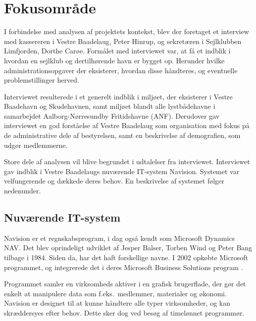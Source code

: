 \section{Fokusområde} %

I forbindelse med analysen af projektets kontekst, blev der foretaget et interview med kassereren i Vestre Baadelaug, Peter Hinrup, og sekretæren i Sejlklubben Limfjorden, Dorthe Carøe. Formålet med interviewet var, at få et indblik i hvordan en sejlklub og dertilhørende havn er bygget op. Herunder hvilke administrationsopgaver der eksisterer, hvordan disse håndteres, og eventuelle problemstillinger herved. 

Interviewet resulterede i et generelt indblik i miljøet, der eksisterer i Vestre Baadehavn og Skudehavnen, samt miljøet blandt alle lystbådehavne i samarbejdet Aalborg-Nørresundby Fritidshavne (ANF). Derudover gav interviewet en god forståelse af Vestre Baadelaug som organisation med fokus på de administrative dele af bestyrelsen, samt en beskrivelse af demografien, som udgør medlemmerne.

Store dele af analysen vil blive begrundet i udtalelser fra interviewet. Interviewet gav indblik i Vestre Baadelaugs nuværende IT-system Navision. Systemet var velfungerende og dækkede deres behov. En beskrivelse af systemet følger nedenunder. 

\subsection{Nuværende IT-system} %
\label{sub:nuv_it_system}
Navision er et regnskabsprogram, i dag også kendt som Microsoft Dynamics NAV. Det blev oprindeligt udviklet af Jesper Balser, Torben Wind og Peter Bang tilbage i 1984. Siden da, har det haft forskellige navne. I 2002 opkøbte Microsoft programmet, og integrerede det i deres Microsoft Business Solutions program \cite{visiondata}.

Programmet samler en virksomheds aktiver i en grafisk brugerflade, der gør det enkelt at manipulere data som f.eks.\ medlemmer, materialer og økonomi. Navision er designet til at kunne håndtere alle typer virksomheder, og kan skræddersyes efter behov. Dette sker dog ved besøg af timelønnet programmør.



